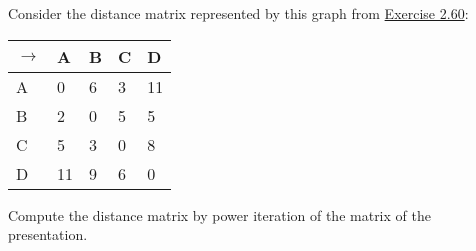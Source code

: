 Consider the distance matrix represented by this graph from \href{doc/1 math/Seven Sketches in Compositionality/Chapter 2: Resource theories/3 Enrichment/3 Lawvere metric spaces/4 Exercise 2-60}{Exercise 2.60}:


    \begin{minipage}{0.48\textwidth}
      \centering
      \begin{tabular}{|l|l|l|l|l|}
        \hline

        $\rightarrow$ & A  & B & C & D  \\ \hline
        A             & 0  & 6 & 3 & 11 \\ \hline
        B             & 2  & 0 & 5 & 5  \\ \hline
        C             & 5  & 3 & 0 & 8  \\ \hline
        D             & 11 & 9 & 6 & 0  \\ \hline
      \end{tabular}
    \end{minipage}

    Compute the distance matrix by power iteration of the matrix of the presentation.